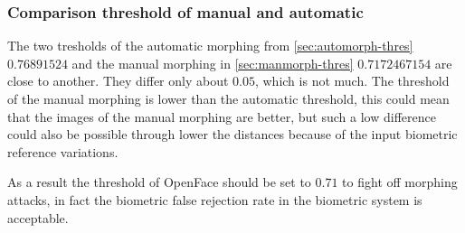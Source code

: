 \subsubsection{Comparison threshold of manual and automatic}\label{sec:comp-thres}
The two tresholds of the automatic morphing from \autoref{sec:automorph-thres} $0.76891524$ and the manual morphing in \autoref{sec:manmorph-thres} $0.7172467154$ are close to another. They differ only about $0.05$, which is not much. The threshold of the manual morphing is lower than the automatic threshold, this could mean that the images of the manual morphing are better, but such a low difference could also be possible through lower the distances because of the input biometric reference variations.

As a result the threshold of OpenFace should be set to $0.71$ to fight off morphing attacks, in fact the biometric false rejection rate in the biometric system is acceptable.

